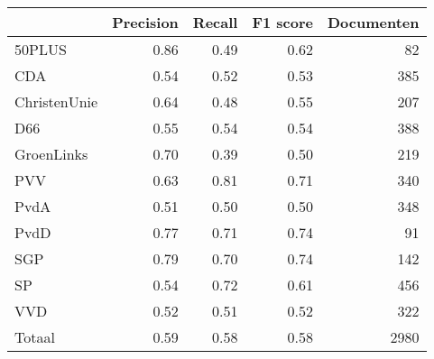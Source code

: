 \begin{tabular}{lrrrr}
\toprule
{} &  Precision &  Recall &  F1 score &  Documenten \\
\midrule
50PLUS       &       0.86 &    0.49 &      0.62 &          82 \\
CDA          &       0.54 &    0.52 &      0.53 &         385 \\
ChristenUnie &       0.64 &    0.48 &      0.55 &         207 \\
D66          &       0.55 &    0.54 &      0.54 &         388 \\
GroenLinks   &       0.70 &    0.39 &      0.50 &         219 \\
PVV          &       0.63 &    0.81 &      0.71 &         340 \\
PvdA         &       0.51 &    0.50 &      0.50 &         348 \\
PvdD         &       0.77 &    0.71 &      0.74 &          91 \\
SGP          &       0.79 &    0.70 &      0.74 &         142 \\
SP           &       0.54 &    0.72 &      0.61 &         456 \\
VVD          &       0.52 &    0.51 &      0.52 &         322 \\
Totaal       &       0.59 &    0.58 &      0.58 &        2980 \\
\bottomrule
\end{tabular}
